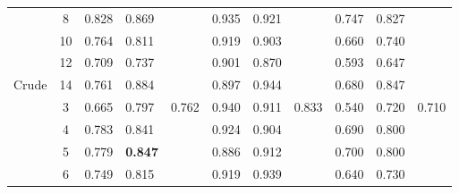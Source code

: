 \begin{table}[]
\begin{tabular}{|c|c|l|l|l|l|l|l|l|l|l|}
                        & 8                     & \cellcolor[HTML]{EFEFEF}0.828          & \cellcolor[HTML]{EFEFEF}0.869          & \cellcolor[HTML]{EFEFEF}               & 0.935    & 0.921    &          & \cellcolor[HTML]{EFEFEF}0.747 & \cellcolor[HTML]{EFEFEF}0.827 & \cellcolor[HTML]{EFEFEF}      \\ \cline{2-11} 
                        & 10                    & \cellcolor[HTML]{EFEFEF}0.764          & \cellcolor[HTML]{EFEFEF}0.811          & \cellcolor[HTML]{EFEFEF}               & 0.919    & 0.903    &          & \cellcolor[HTML]{EFEFEF}0.660 & \cellcolor[HTML]{EFEFEF}0.740 & \cellcolor[HTML]{EFEFEF}      \\ \cline{2-11} 
                        & 12                    & \cellcolor[HTML]{EFEFEF}0.709          & \cellcolor[HTML]{EFEFEF}0.737          & \cellcolor[HTML]{EFEFEF}               & 0.901    & 0.870    &          & \cellcolor[HTML]{EFEFEF}0.593 & \cellcolor[HTML]{EFEFEF}0.647 & \cellcolor[HTML]{EFEFEF}      \\ \cline{2-11} 
\multirow{-9}{*}{Crude} & 14                    & \cellcolor[HTML]{EFEFEF}0.761          & \cellcolor[HTML]{EFEFEF}0.884          & \cellcolor[HTML]{EFEFEF}               & 0.897    & 0.944    &          & \cellcolor[HTML]{EFEFEF}0.680 & \cellcolor[HTML]{EFEFEF}0.847 & \cellcolor[HTML]{EFEFEF}      \\ \hline
                        & 3                     & \cellcolor[HTML]{EFEFEF}0.665          & \cellcolor[HTML]{EFEFEF}0.797	  & \cellcolor[HTML]{EFEFEF}0.762	   & 0.940    & 0.911    & 0.833    & \cellcolor[HTML]{EFEFEF}0.540 & \cellcolor[HTML]{EFEFEF}0.720 & \cellcolor[HTML]{EFEFEF}0.710 \\ \cline{2-11} 
                        & 4                     & \cellcolor[HTML]{EFEFEF}0.783		 & \cellcolor[HTML]{EFEFEF}0.841	  & \cellcolor[HTML]{EFEFEF}               & 0.924    & 0.904    &          & \cellcolor[HTML]{EFEFEF}0.690 & \cellcolor[HTML]{EFEFEF}0.800 & \cellcolor[HTML]{EFEFEF}      \\ \cline{2-11} 
                        & 5                     & \cellcolor[HTML]{EFEFEF}0.779		 & \cellcolor[HTML]{EFEFEF}\textbf{0.847} & \cellcolor[HTML]{EFEFEF}               & 0.886    & 0.912    &          & \cellcolor[HTML]{EFEFEF}0.700 & \cellcolor[HTML]{EFEFEF}0.800 & \cellcolor[HTML]{EFEFEF}      \\ \cline{2-11} 
                        & 6                     & \cellcolor[HTML]{EFEFEF}0.749		 & \cellcolor[HTML]{EFEFEF}0.815	  & \cellcolor[HTML]{EFEFEF}               & 0.919    & 0.939    &          & \cellcolor[HTML]{EFEFEF}0.640 & \cellcolor[HTML]{EFEFEF}0.730 & \cellcolor[HTML]{EFEFEF}      \\ \cline{2-11} 

\end{tabular}
\end{table}
